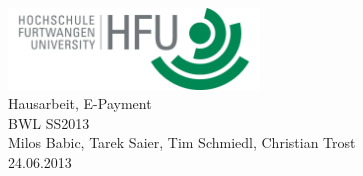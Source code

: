 \documentclass[pdftex,fontsize=11pt,a4paper]{scrbook}
\begin{document}
\begin{titlepage}
\thispagestyle{empty}
\begin{center}
\includegraphics[width=0.5\textwidth]{img/hfu.png}~\\[1.5cm]
\Huge Hausarbeit, E-Payment\\[0.4cm]
\Huge BWL SS2013\\[1cm]
\LARGE Milos Babic, Tarek Saier, Tim Schmiedl, Christian Trost\\[0.2cm]
\normalsize 24.06.2013
\end{center}
\end{titlepage}
\end{document}
